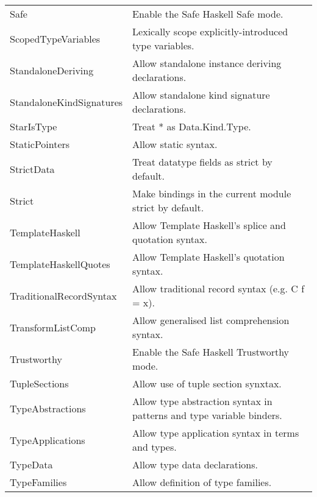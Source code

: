 \documentclass[openany, 12pt]{book}
\begin{document}
\begin{longtable}{ll}
	Safe                       & Enable the Safe Haskell Safe mode.                                         \\
	ScopedTypeVariables        & Lexically scope explicitly-introduced type variables.                      \\
	StandaloneDeriving         & Allow standalone instance deriving declarations.                           \\
	StandaloneKindSignatures   & Allow standalone kind signature declarations.                              \\
	StarIsType                 & Treat * as Data.Kind.Type.                                                 \\
	StaticPointers             & Allow static syntax.                                                       \\
	StrictData                 & Treat datatype fields as strict by default.                                \\
	Strict                     & Make bindings in the current module strict by default.                     \\
	TemplateHaskell            & Allow Template Haskell's splice and quotation syntax.                      \\
	TemplateHaskellQuotes      & Allow Template Haskell's quotation syntax.                                 \\
	TraditionalRecordSyntax    & Allow traditional record syntax (e.g. C {f = x}).                          \\
	TransformListComp          & Allow generalised list comprehension syntax.                               \\
	Trustworthy                & Enable the Safe Haskell Trustworthy mode.                                  \\
	TupleSections              & Allow use of tuple section synxtax.                                        \\
	TypeAbstractions           & Allow type abstraction syntax in patterns and type variable binders.       \\
	TypeApplications           & Allow type application syntax in terms and types.                          \\
	TypeData                   & Allow type data declarations.                                              \\
	TypeFamilies               & Allow definition of type families.                                         \\

\end{longtable}
\end{document}
